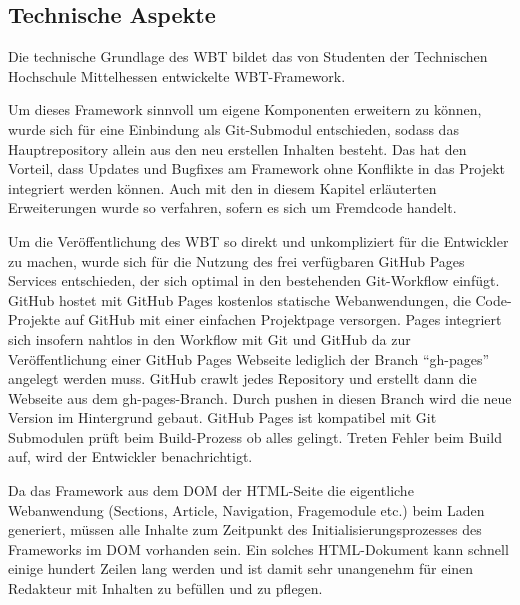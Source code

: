 \documentclass{article}
\begin{document}
\subsection{Technische Aspekte}
\label{ssec:tech}
Die technische Grundlage des WBT bildet das von Studenten der Technischen Hochschule Mittelhessen entwickelte WBT-Framework.

Um dieses Framework sinnvoll um eigene Komponenten erweitern zu k\"onnen, wurde sich f\"ur eine Einbindung als Git-Submodul entschieden, sodass das Hauptrepository allein aus den neu erstellen Inhalten besteht. Das hat den Vorteil, dass Updates und Bugfixes am Framework ohne Konflikte in das Projekt integriert werden k\"onnen. Auch mit den in diesem Kapitel erl\"auterten Erweiterungen wurde so verfahren, sofern es sich um Fremdcode handelt.

Um die Ver\"offentlichung des WBT so direkt und unkompliziert f\"ur die Entwickler zu machen, wurde sich f\"ur die Nutzung des frei verf\"ugbaren GitHub Pages Services entschieden, der sich optimal in den bestehenden Git-Workflow einf\"ugt. GitHub hostet mit GitHub Pages kostenlos statische Webanwendungen, die Code-Projekte auf GitHub mit einer einfachen Projektpage versorgen. Pages integriert sich insofern nahtlos in den Workflow mit Git und GitHub da zur Ver\"offentlichung einer GitHub Pages Webseite lediglich der Branch “gh-pages” angelegt werden muss. GitHub crawlt jedes Repository und erstellt dann die Webseite aus dem gh-pages-Branch. Durch pushen in diesen Branch wird die neue Version im Hintergrund gebaut. GitHub Pages ist kompatibel mit Git Submodulen pr\"uft beim Build-Prozess ob alles gelingt. Treten Fehler beim Build auf, wird der Entwickler benachrichtigt.

Da das Framework aus dem DOM der HTML-Seite die eigentliche Webanwendung (Sections, Article, Navigation, Fragemodule etc.) beim Laden generiert, m\"ussen alle Inhalte zum Zeitpunkt des Initialisierungsprozesses des Frameworks im DOM vorhanden sein. Ein solches HTML-Dokument kann schnell einige hundert Zeilen lang werden und ist damit sehr unangenehm f\"ur einen Redakteur mit Inhalten zu bef\"ullen und zu pflegen. 
\end{document}
